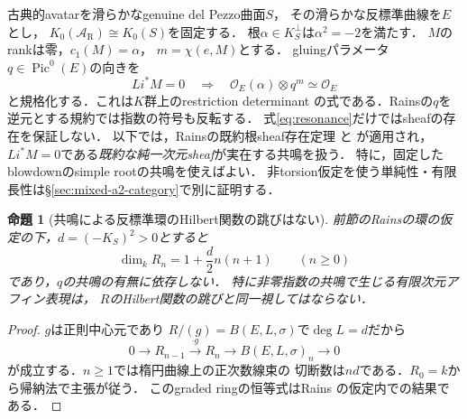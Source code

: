 \documentclass[11pt,a4paper]{ltjsarticle}
\newtheorem{proposition}[theorem]{命題}
\theoremstyle{definition}\newtheorem{remark}[theorem]{注意}
\DeclareMathOperator{\Pic}{Pic}
\begin{document}
古典的avatarを滑らかなgenuine del Pezzo曲面$S$，
その滑らかな反標準曲線を$E$とし，
$K_0(\mathcal A_{\mathrm R})\cong K_0(S)$を固定する．
根$\alpha\in K_S^\perp$は$\alpha^2=-2$を満たす．
$M$のrankは零，$c_1(M)=\alpha$，
$m=\chi(e,M)$とする．
gluingパラメータ$q\in\Pic^0(E)$の向きを
\begin{equation}\label{eq:resonance}
 Li^*M=0\quad\Longrightarrow\quad
 \mathcal O_E(\alpha)\otimes q^{m}\simeq\mathcal O_E
\end{equation}
と規格化する．これは$K$群上のrestriction determinant
の式である．Rainsの$q$を逆元とする規約では指数の符号も反転する．
式\eqref{eq:resonance}だけではsheafの存在を保証しない．
以下では，Rainsの既約根sheaf存在定理
\cite[\S9, \S11, pp.~139--141]{RainsBirational}と
\cite[\S4, pp.~33--35]{RainsFiltered}が適用され，
$Li^*M=0$である\emph{既約な純一次元sheaf}が実在する共鳴を扱う．
特に，固定したblowdownのsimple rootの共鳴を使えばよい．
非torsion仮定を使う単純性・有限長性は\S\ref{sec:mixed-a2-category}で別に証明する．

\begin{proposition}[共鳴による反標準環のHilbert関数の跳びはない]
\label{prop:hilbert-no-jump}
前節のRainsの環の仮定の下，$d=(-K_S)^2>0$とすると
\[
 \dim_k R_n=1+\frac d2 n(n+1)\qquad(n\ge0)
\]
であり，$q$の共鳴の有無に依存しない．
特に非零指数の共鳴で生じる有限次元アフィン表現は，
$R$のHilbert関数の跳びと同一視してはならない．
\end{proposition}
\begin{proof}
$g$は正則中心元であり
$R/(g)=B(E,L,\sigma)$で$\deg L=d$だから
\[
0\longrightarrow R_{n-1}\xrightarrow{\cdot g}R_n
\longrightarrow B(E,L,\sigma)_n\longrightarrow0
\]
が成立する．$n\ge1$では楕円曲線上の正次数線束の
切断数は$nd$である．$R_0=k$から帰納法で主張が従う．
このgraded ringの恒等式はRains
\cite[Proposition 5.1]{RainsFiltered}の仮定内での結果である．
\end{proof}



\end{document}
